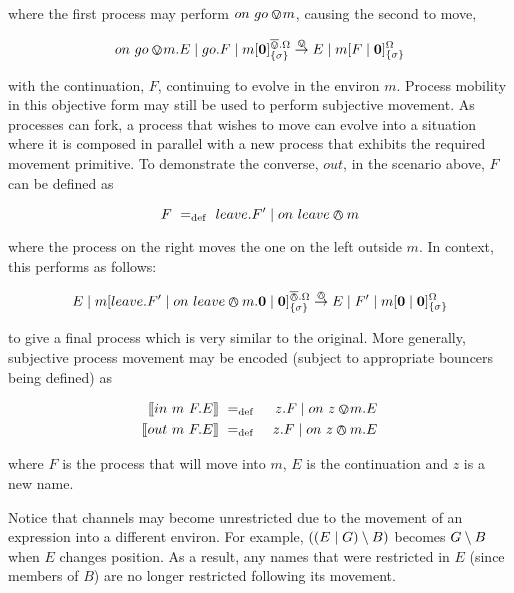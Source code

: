 \documentclass[orivec,envcountsame]{llncs}
\begin{document}
\noindent where the first process may perform $on\ go \varovee\!m$, causing
the second to move,

\begin{equation}
on\ go \varovee\!m.E \mid go.F \mid {m}[ \textbf{0} ]^{\overline{\varovee}.\Omega}_{\{\sigma\}} \stackrel{\varovee}{\rightarrow}
E \mid {m}[ F \mid \textbf{0} ]^{\Omega}_{\{\sigma\}}
\end{equation}

\noindent with the continuation, $F$, continuing to evolve in the
environ $m$.  Process mobility in this objective form may still be used
to perform subjective movement.  As processes can fork, a process that
wishes to move can evolve into a situation where it is composed in
parallel with a new process that exhibits the required movement
primitive.  To demonstrate the converse, $out$, in the scenario
above, $F$ can be defined as

\begin{equation}
F \mathrel{~=_\mathrm{def}~} leave.F^\prime \mid on\ leave \varowedge m
\end{equation}

\noindent where the process on the right moves the one on the left
outside $m$.  In context, this performs as follows:

\begin{equation}
E \mid {m}[ leave.F^\prime \mid on\ leave \varowedge m.\textbf{0} \mid
 \textbf{0} ]^{\overline{\varowedge}.\Omega}_{\{\sigma\}} 
\stackrel{\varowedge}{\rightarrow}
E \mid F^\prime \mid {m}[ \textbf{0} \mid \textbf{0} ]^{\Omega}_{\{\sigma\}}
\end{equation}

\noindent to give a final process which is very similar to the original.
More generally, subjective process movement may be encoded (subject to
appropriate bouncers being defined) as

\begin{eqnarray*}
\seml in\ m\ F.E \semr & \eqdef & z.F \pc \procin{z}{m}.E \\
\seml out\ m\ F.E \semr & \eqdef & z.F \pc \procout{z}{m}.E
\end{eqnarray*}

\noindent where $F$ is the process that will move into $m$, $E$ is the
continuation and $z$ is a new name. 

Notice that channels may become unrestricted due to the movement of an
expression into a different environ.  For example, $((E \mid G) \setminus {B})$
becomes $G \setminus {B}$ when $E$ changes position.  As a result, any names
that were restricted in $E$ (since members of $B$) are no longer
restricted following its movement.
\end{document}
